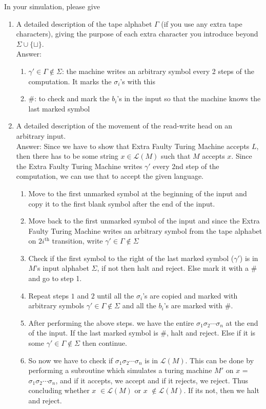 \documentclass{csc_assignment}
\begin{document}
\begin{description}
\begin{enumerate}
  In your simulation, please give
  \begin{enumerate}
  \item A detailed description of the tape alphabet $\Gamma$ (if you use any extra tape characters), giving the purpose of each extra character you introduce beyond $\Sigma \cup \{\sqcup\}$.\\
  Answer: \begin{enumerate}
  \item $\gamma' \in \Gamma \notin \Sigma$: the machine writes an arbitrary symbol every 2 steps of the computation. It marks the $\sigma_{i}$'s with this
  \item $\#$: to check and mark the $b_{i}$'s in the input so that the machine knows the last marked symbol
  \end{enumerate}
  \item A detailed description of the movement of the read-write head on an arbitrary input.\\
  Answer: Since we have to show that Extra Faulty Turing Machine accepts $L$, then there has to be some string $x \in \mathcal{L}(M)$ such that $M$ accepts $x$. Since the Extra Faulty Turing Machine writes $\gamma'$ every 2nd step of the computation, we can use that to accept the given language.
  \begin{enumerate}
      \item Move to the first unmarked symbol at the beginning of the input and copy it to the first blank symbol after the end of the input.
      \item Move back to the first unmarked symbol of the input and since the Extra Faulty Turing Machine writes an arbitrary symbol from the tape alphabet on $2i^{\text{th}}$ transition, write $\gamma' \in \Gamma \notin \Sigma$
      \item Check if the first symbol to the right of the last marked symbol ($\gamma'$) is in $M$'s input alphabet $\Sigma$, if not then halt and reject. Else mark it with a $\#$ and go to step 1.
      \item Repeat steps $1$ and $2$ until all the $\sigma_i$'s are copied and marked with arbitrary symbols $\gamma' \in \Gamma \notin \Sigma$ and all the $b_i$'s are marked with $\#$.
      \item After performing the above steps. we have the entire $\sigma_1\sigma_2 \cdots \sigma_n$ at the end of the input. If the last marked symbol is $\#$, halt and reject. Else if it is some $\gamma' \in \Gamma \notin \Sigma$ then continue.
      \item So now we have to check if $\sigma_1\sigma_2 \cdots \sigma_n$ is in $\mathcal{L}(M)$. This can be done by performing a subroutine which simulates a turing machine $M'$ on $x$ = $\sigma_1\sigma_2 \cdots \sigma_n$, and if it accepts, we accept and if it rejects, we reject. Thus concluding whether $x$ $\in \mathcal{L}(M)$ or $x$ $\notin \mathcal{L}(M)$. If its not, then we halt and reject. 
 

\end{enumerate}
\end{enumerate}
\end{enumerate}
\end{description}
\end{document}
